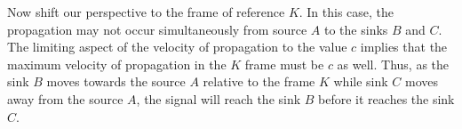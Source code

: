 \documentclass{article}
\begin{document}
\begin{exmp}
				Now shift our perspective to the frame of reference $K$. In this case, the propagation may not occur simultaneously from source $A$ to the sinks $B$ and $C$. The limiting aspect of the velocity of propagation to the value $c$ implies that the maximum velocity of propagation in the $K$ frame must be $c$ as well. Thus, as the sink $B$ moves towards the source $A$ relative to the frame $K$ while sink $C$ moves away from the source $A$, the signal will reach the sink $B$ before it reaches the sink $C$.
			
			\end{exmp}
			
			
\end{document}

